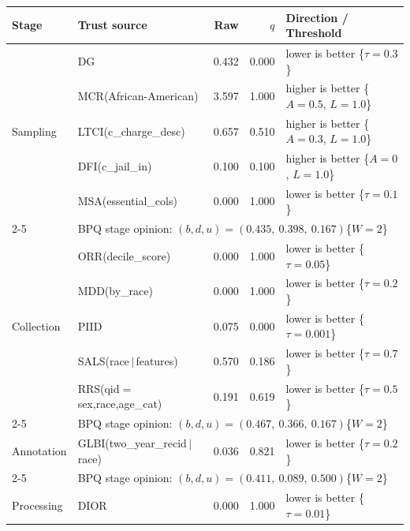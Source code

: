 \begin{table}[!htbp]
  \centering
  \small
  \renewcommand{\arraystretch}{1.1}
  \begin{tabular}{@{}llrrl@{}}
    \toprule
    \textbf{Stage} & \textbf{Trust source} & \textbf{Raw} & \textbf{$q$} & \textbf{Direction / Threshold} \\
    \midrule
    \multirow{5}{*}{Sampling}
      & DG                                  & 0.432  & 0.000 & lower is better \{$\tau{=}0.3$\} \\
      & MCR(African-American)           & 3.597 & 1.000 & higher is better \{$A{=}0.5$, $L{=}1.0$\} \\
      & LTCI(c\_charge\_desc)               & 0.657  & 0.510 & higher is better \{$A{=}0.3$, $L{=}1.0$\}\\
      & DFI(c\_jail\_in)                    & 0.100 & 0.100 & higher is better \{$A{=}0$, $L{=}1.0$\} \\
      & MSA(essential\_cols)                & 0.000  & 1.000 & lower is better \{$\tau{=}0.1$\} \\
    \cmidrule(lr){2-5}
      & \multicolumn{4}{l}{\ac{BPQ} stage opinion: $(b, d, u) = (0.435,\ 0.398,\ 0.167)$\quad \{$W{=}2$\}} \\
    \midrule
    \multirow{5}{*}{Collection}
      & ORR(decile\_score)                  & 0.000  & 1.000 & lower is better \{$\tau{=}0.05$\} \\
      & MDD(by\_race)                       & 0.000  & 1.000 & lower is better \{$\tau{=}0.2$\} \\
      & PIID                                & 0.075  & 0.000 & lower is better \{$\tau{=}0.001$\} \\
      & SALS(race$\,|\,$features)           & 0.570  & 0.186 & lower is better \{$\tau{=}0.7$\} \\
      & RRS(qid$=$sex,race,age\_cat)        & 0.191  & 0.619 & lower is better \{$\tau{=}0.5$\} \\
    \cmidrule(lr){2-5}
      & \multicolumn{4}{l}{\ac{BPQ} stage opinion: $(b, d, u) = (0.467,\ 0.366,\ 0.167)$\quad \{$W{=}2$\}} \\
    \midrule
    Annotation
      & GLBI(two\_year\_recid$\,|\,$race)   & 0.036  & 0.821 & lower is better \{$\tau{=}0.2$\} \\
    \cmidrule(lr){2-5}
      & \multicolumn{4}{l}{\ac{BPQ} stage opinion: $(b, d, u) = (0.411,\ 0.089,\ 0.500)$\quad \{$W{=}2$\}} \\
    \midrule
    \multirow{2}{*}{Processing}
      & DIOR                                & 0.000  & 1.000 & lower is better \{$\tau{=}0.01$\}  \\

\end{tabular}
\end{table}
